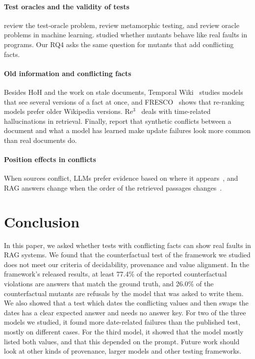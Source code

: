 \documentclass[preprint,12pt,authoryear]{elsarticle}
\begin{document}
\paragraph{Test oracles and the validity of tests}
\citet{barr2015oracle} review the test-oracle problem, \citet{segura2016survey} review metamorphic
testing, and \citet{seca2021review} review oracle problems in machine learning.
\citet{just2014mutants} studied whether mutants behave like real faults in programs. Our RQ4 asks the
same question for mutants that add conflicting facts.

\paragraph{Old information and conflicting facts}
Besides HoH and the work on stale documents, Temporal Wiki~\citep{ozer2025temporal} studies models
that see several versions of a fact at once, and FRESCO~\citep{an2026fresco} shows that re-ranking
models prefer older Wikipedia versions. Re$^3$~\citep{cao2026re3} deals with time-related
hallucinations in retrieval. Finally, \citet{kortukov2024studying} report that synthetic conflicts
between a document and what a model has learned make update failures look more common than real
documents do.

\paragraph{Position effects in conflicts}
When sources conflict, LLMs prefer evidence based on where it appears~\citep{naphade2026rational,yang2026contextual},
and RAG answers change when the order of the retrieved passages changes~\citep{zhang2026stablerag}.

\section{Conclusion}
\label{sec:conclusion}

In this paper, we asked whether tests with conflicting facts can show real faults in RAG systems. We
found that the counterfactual test of the framework we studied does not meet our criteria of
decidability, provenance and value alignment. In the framework's released results, at least 77.4\% of
the reported counterfactual violations are answers that match the ground truth, and 26.0\% of the
counterfactual mutants are refusals by the model that was asked to write them. We also showed that a
test which dates the conflicting values and then swaps the dates has a clear expected answer and needs
no answer key. For two of the three models we studied, it found more date-related failures than the
published test, mostly on different cases. For the third model, it showed that the model mostly
listed both values, and that this depended on the prompt. Future work should look at other kinds of
provenance, larger models and other testing frameworks.
\end{document}
